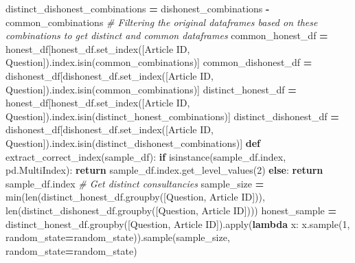 \documentclass[
]{article}
\newenvironment{Shaded}{\begin{snugshade}}{\end{snugshade}}
\newcommand{\BuiltInTok}[1]{#1}
\newcommand{\CommentTok}[1]{\textcolor[rgb]{0.56,0.35,0.01}{\textit{#1}}}
\newcommand{\ControlFlowTok}[1]{\textcolor[rgb]{0.13,0.29,0.53}{\textbf{#1}}}
\newcommand{\DecValTok}[1]{\textcolor[rgb]{0.00,0.00,0.81}{#1}}
\newcommand{\KeywordTok}[1]{\textcolor[rgb]{0.13,0.29,0.53}{\textbf{#1}}}
\newcommand{\NormalTok}[1]{#1}
\newcommand{\OperatorTok}[1]{\textcolor[rgb]{0.81,0.36,0.00}{\textbf{#1}}}
\newcommand{\StringTok}[1]{\textcolor[rgb]{0.31,0.60,0.02}{#1}}
\begin{document}
\begin{Shaded}
\begin{Highlighting}[]
\NormalTok{    distinct\_dishonest\_combinations }\OperatorTok{=}\NormalTok{ dishonest\_combinations }\OperatorTok{{-}}\NormalTok{ common\_combinations}
    \CommentTok{\# Filtering the original dataframes based on these combinations to get distinct and common dataframes}
\NormalTok{    common\_honest\_df }\OperatorTok{=}\NormalTok{ honest\_df[honest\_df.set\_index([}\StringTok{\textquotesingle{}Article ID\textquotesingle{}}\NormalTok{, }\StringTok{\textquotesingle{}Question\textquotesingle{}}\NormalTok{]).index.isin(common\_combinations)]}
\NormalTok{    common\_dishonest\_df }\OperatorTok{=}\NormalTok{ dishonest\_df[dishonest\_df.set\_index([}\StringTok{\textquotesingle{}Article ID\textquotesingle{}}\NormalTok{, }\StringTok{\textquotesingle{}Question\textquotesingle{}}\NormalTok{]).index.isin(common\_combinations)]}
\NormalTok{    distinct\_honest\_df }\OperatorTok{=}\NormalTok{ honest\_df[honest\_df.set\_index([}\StringTok{\textquotesingle{}Article ID\textquotesingle{}}\NormalTok{, }\StringTok{\textquotesingle{}Question\textquotesingle{}}\NormalTok{]).index.isin(distinct\_honest\_combinations)]}
\NormalTok{    distinct\_dishonest\_df }\OperatorTok{=}\NormalTok{ dishonest\_df[dishonest\_df.set\_index([}\StringTok{\textquotesingle{}Article ID\textquotesingle{}}\NormalTok{, }\StringTok{\textquotesingle{}Question\textquotesingle{}}\NormalTok{]).index.isin(distinct\_dishonest\_combinations)]}
    \KeywordTok{def}\NormalTok{ extract\_correct\_index(sample\_df):}
        \ControlFlowTok{if} \BuiltInTok{isinstance}\NormalTok{(sample\_df.index, pd.MultiIndex):}
            \ControlFlowTok{return}\NormalTok{ sample\_df.index.get\_level\_values(}\DecValTok{2}\NormalTok{)}
        \ControlFlowTok{else}\NormalTok{:}
            \ControlFlowTok{return}\NormalTok{ sample\_df.index}
    \CommentTok{\# Get distinct consultancies}
\NormalTok{    sample\_size }\OperatorTok{=} \BuiltInTok{min}\NormalTok{(}\BuiltInTok{len}\NormalTok{(distinct\_honest\_df.groupby([}\StringTok{\textquotesingle{}Question\textquotesingle{}}\NormalTok{, }\StringTok{\textquotesingle{}Article ID\textquotesingle{}}\NormalTok{])), }\BuiltInTok{len}\NormalTok{(distinct\_dishonest\_df.groupby([}\StringTok{\textquotesingle{}Question\textquotesingle{}}\NormalTok{, }\StringTok{\textquotesingle{}Article ID\textquotesingle{}}\NormalTok{])))}
\NormalTok{    honest\_sample }\OperatorTok{=}\NormalTok{ distinct\_honest\_df.groupby([}\StringTok{\textquotesingle{}Question\textquotesingle{}}\NormalTok{, }\StringTok{\textquotesingle{}Article ID\textquotesingle{}}\NormalTok{]).}\BuiltInTok{apply}\NormalTok{(}\KeywordTok{lambda}\NormalTok{ x: x.sample(}\DecValTok{1}\NormalTok{, random\_state}\OperatorTok{=}\NormalTok{random\_state)).sample(sample\_size, random\_state}\OperatorTok{=}\NormalTok{random\_state)}

\end{Highlighting}
\end{Shaded}
\end{document}
